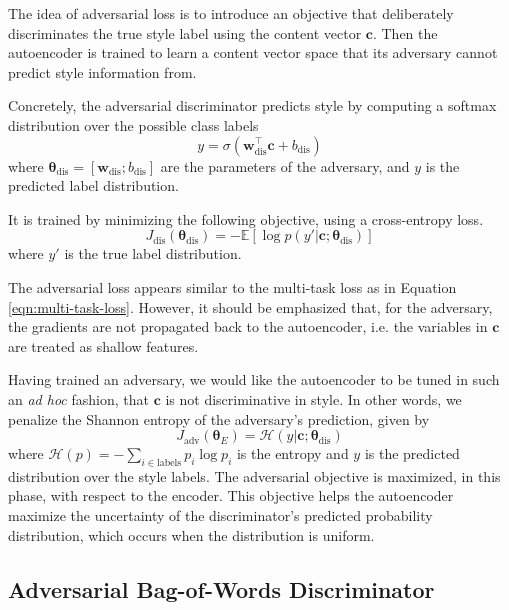 \documentclass[letterpaper]{article} %
\newcommand{\loss}[1]{J_\text{#1}}
\begin{document}
The idea of adversarial loss is to introduce an objective that deliberately discriminates the true style label using the content vector $\bm c$. Then the autoencoder is trained to learn a content vector space that its adversary cannot predict style information from.

Concretely, the adversarial discriminator predicts style by computing a softmax distribution over the possible class labels
\begin{equation}
	y = \sigma(\bm w_\text{dis}^\top \bm c + b_\text{dis})
\end{equation}
where $\bm\theta_\text{dis}=[\bm w_\text{dis}; b_\text{dis}]$ are the parameters of the adversary, and $y$ is the predicted label distribution.

It is trained by minimizing the following objective, using a cross-entropy loss.
\begin{equation} \label{eqn:adv-disc-loss}
	\loss{dis}(\bm\theta_\text{dis}) =
	- \mathbb{E} [\log p(y' | \bm c; \bm\theta_\text{dis})]
\end{equation}
where $y'$ is the true label distribution.

The adversarial loss appears similar to the multi-task loss as in Equation \ref{eqn:multi-task-loss}. However, it should be emphasized that, for the adversary, the gradients are not propagated back to the autoencoder, i.e. the variables in $\bm c$ are treated as shallow features.

Having trained an adversary, we would like the autoencoder to be tuned in such an \textit{ad hoc} fashion, that $\bm c$ is not discriminative in style. In other words, we penalize the Shannon entropy of the adversary's prediction, given by
\begin{equation}
	\loss{adv}(\bm\theta_E)=\mathcal{H}(y|\bm c; \bm\theta_\text{dis})
\end{equation}
where $\mathcal{H}(p)=-\sum_{i\in\text{labels}}p_i\log p_i$ is the entropy and $y$ is the predicted distribution over the style labels. The adversarial objective is maximized, in this phase, with respect to the encoder. This objective helps the autoencoder maximize the uncertainty of the discriminator's predicted probability distribution, which occurs when the distribution is uniform.


\subsection{Adversarial Bag-of-Words Discriminator} \label{ssec:adversarial-bow-objective}
\end{document}
